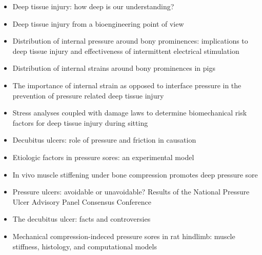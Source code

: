 \begin{itemize}
				\item Deep tissue injury: how deep is our understanding? \cite{stekelenburg08}
				\item Deep tissue injury from a bioengineering point of view \cite{gefen09}
				\item Distribution of internal pressure around bony prominences: implications to deep tissue injury and effectiveness of intermittent electrical stimulation \cite{solis12-02}
				\item Distribution of internal strains around bony prominences in pigs \cite{solis12-03}
				\item The importance of internal strain as opposed to interface pressure in the prevention of pressure related deep tissue injury \cite{oomens10}
				\item Stress analyses coupled with damage laws to determine biomechanical risk factors for deep tissue injury during sitting \cite{linderganz09}
				\item Decubitus ulcers: role of pressure and friction in causation \cite{dinsdale74}
				\item Etiologic factors in pressure sores: an experimental model \cite{daniel81}
				\item In vivo muscle stiffening under bone compression promotes deep pressure sore \cite{gefen05}
				\item Pressure ulcers: avoidable or unavoidable? Results of the National Pressure Ulcer Advisory Panel Consensus Conference \cite{black11}
				\item The decubitus ulcer: facts and controversies \cite{campbell10}
				\item Mechanical compression-indeced pressure sores in rat hindlimb: muscle stiffness, histology, and computational models \cite{linderganz04}
			\end{itemize}

